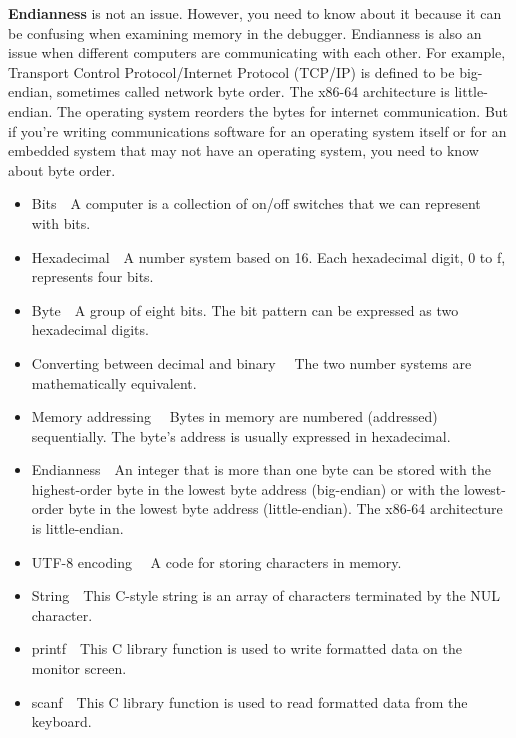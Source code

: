 \documentclass[12pt]{extarticle}
\begin{document}
\vspace{18pt}
\textbf{Endianness} is not an issue. However, you need to know about it because it can 
be confusing when examining memory in the debugger. Endianness is also an issue when 
different computers are communicating with each other. For example, Transport Control 
Protocol/Internet Protocol (TCP/IP) is defined to be big-endian, sometimes called network
byte order. The x86-64 architecture is little-endian. The operating system reorders the 
bytes for internet communication. But if you’re writing communications software for an 
operating system itself or for an embedded system that may not have an operating system, 
you need to know about byte order.

\vspace{18pt}
\begin{itemize}
\item Bits  A computer is a collection of on/off switches that we can represent with bits.
\item Hexadecimal  A number system based on 16. Each hexadecimal digit, 0 to f, 
represents four bits.
\item Byte  A group of eight bits. The bit pattern can be expressed as two hexadecimal digits.
\item Converting between decimal and binary   The two number systems are 
mathematically equivalent.
\item Memory addressing   Bytes in memory are numbered (addressed) sequentially. 
  The byte’s address is usually expressed in hexadecimal.
\item Endianness  An integer that is more than one byte can be stored with the 
  highest-order byte in the lowest byte address (big-endian) or with the lowest-order byte
  in the lowest byte address (little-endian). The x86-64 architecture is little-endian.
\item UTF-8 encoding   A code for storing characters in memory.
\item String  This C-style string is an array of characters terminated by the NUL character.
\item printf  This C library function is used to write formatted data on the monitor screen.
\item scanf  This C library function is used to read formatted data from the keyboard.
\end{itemize}
\end{document}
